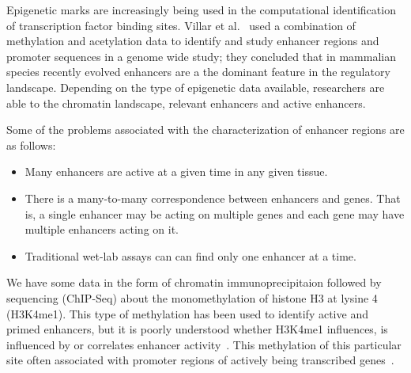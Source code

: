         Epigenetic marks are increasingly being used in the computational identification of transcription factor binding sites. Villar et al.~\cite{villar2015enhancer} used a combination of methylation and acetylation data to identify and study enhancer regions and promoter sequences in a genome wide study; they concluded that in mammalian species recently evolved enhancers are a the dominant feature in the regulatory landscape. Depending on the type of epigenetic data available, researchers are able to the chromatin landscape, relevant enhancers and active enhancers.
        

        Some of the problems associated with the characterization of enhancer regions are as follows:
            \begin{itemize}
        		\item Many enhancers are active at a given time in any given tissue. 
        		\item There is a many-to-many correspondence between enhancers and genes. That is, a single enhancer may be acting on multiple genes and each gene may have multiple enhancers acting on it. 
        		\item Traditional wet-lab assays can can find only one enhancer at a time. 
        	\end{itemize}
        	
        	
        We have some data in the form of chromatin immunoprecipitaion followed by sequencing (ChIP-Seq) about the monomethylation of histone H3 at lysine 4 (H3K4me1). This type of methylation has been used to identify active and primed enhancers, but it is poorly understood whether H3K4me1 influences, is influenced by or correlates enhancer activity~\cite{rada2018h3k4me1}. This methylation of this particular site often associated with promoter regions of actively being transcribed genes~\cite{barski2007high}. 
        


        
